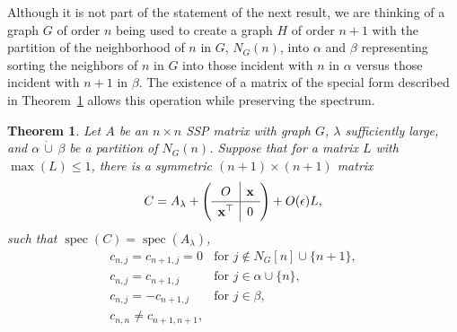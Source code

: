 \documentclass[11pt]{article}
\newtheorem{thm}{Theorem}[section]
\theoremstyle{definition}
\theoremstyle{definition}
\theoremstyle{definition}
\newcommand{\dcup}{\,\dot{\cup}\,}
\newcommand{\x}{\times}
\newcommand{\lam}{\lambda}
\def\spec{\operatorname{spec}}
\def\trans{^{\top}}
\begin{document}
Although it is not part of the statement of the next result, we are thinking of a graph $G$ of order $n$  being used to create a graph $H$ of order $n+1$ with the partition of   the neighborhood of $n$ in $G$, $N_G(n)$, into $\alpha$ and $\beta$ representing sorting the neighbors of $n$ in $G$ into those incident with {$n$ in $\alpha$ versus those incident with $n+1$ in $\beta$}. The existence of  a matrix of  the special form described in Theorem~\ref{cor:form} allows this operation while preserving the spectrum.   %

\begin{thm}
\label{cor:form}
Let $A$ be an $n \times n$ SSP matrix with graph $G$, $\lam$ {sufficiently large}, %
and $\alpha\dcup \beta$ be a partition of  $N_G(n)$.
Suppose that for a matrix $L$ with $\max(L)\leq 1$, there is a symmetric $(n+1)\x (n+1)$ matrix 
\[ C=A_{\lambda} + \left(\renewcommand{\arraystretch}{1.3} \begin{array}{c|c} O & \mathbf{x} \\ \hline \mathbf{x}\trans &  0\end{array} \right)+O(\epsilon)L,\]
such that {$\spec(C)=\spec(A_{\lam})$,} 
\[ {   \begin{array}{ll} c_{n,j}=c_{n+1,j}= 0 & \mbox{for $j \not\in N_G[n] \cup \{ n+1\}$}, \\
  c_{n,j}=c_{n+1,j}  & \mbox{for  $j\in \alpha\cup\{n\}$}, \\
   c_{n,j}=-c_{n+1,j} & \mbox{for $j\in \beta$,}\\
    c_{n,n}\ne c_{n+1,n+1}, & 
 

\end{array}}\]
\end{thm}
\end{document}
